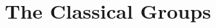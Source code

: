 \documentclass[a4paper,11pt]{article}
\def\maintitle#1{\section*{#1}}
\begin{document}
\else %
    \def\maintitle#1{\section{#1}}
\fi


\maintitle{The Classical Groups}


\def\ChapThreeSecOne{Chapter 3 section 1 is defined.}


\def\ChapThreeSecTwo{Chapter 3 section 2 is defined.}


\def\ChapThreeSecThree{Chapter 3 section 3 is defined.}





\ifx\ChapThree\undefined %
     
\end{document}
